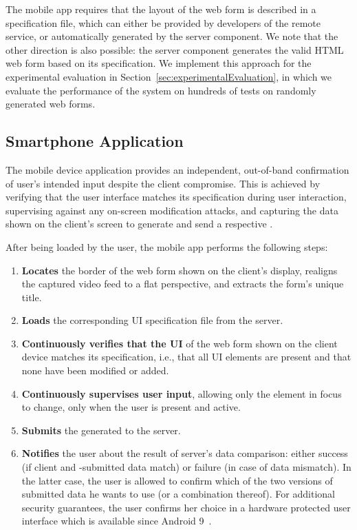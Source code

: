 The mobile app requires that the layout of the web form is described in a specification file, which can either be provided by developers of the remote service, or automatically generated by the \sysname server component.
We note that the other direction is also possible: the server component generates the valid HTML web form based on its specification.
We implement this approach for the experimental evaluation in Section~\ref{sec:experimentalEvaluation}, in which we evaluate the performance of the system on hundreds of tests on randomly generated web forms.




\subsection{\sysname Smartphone Application} \label{sec:systemDesign:phone}

The mobile device application provides an independent, out-of-band confirmation of user's intended input despite the client compromise.
This is achieved by verifying that the user interface matches its specification during user interaction, supervising against any on-screen modification attacks, and capturing the data shown on the client's screen to generate and send a respective \POI.

After being loaded by the user, the \sysname mobile app performs the following steps:
\begin{enumerate}%
    \item \textbf{Locates} the border of the web form shown on the client's display, realigns the captured video feed to a flat perspective, and extracts the form's unique title.
    \item \textbf{Loads} the corresponding UI specification file from the server.
    \item \textbf{Continuously verifies that the UI} of the web form shown on the client device matches its specification, i.e., that all UI elements are present and that none have been modified or added.
    \item \textbf{Continuously supervises user input}, allowing only the element in focus to change, only when the user is present and active.
	\item \textbf{Submits} the generated \POI to the server.
    \item \textbf{Notifies} the user about the result of server's data comparison: either success (if client and \md -submitted data match) or failure (in case of data mismatch).
    In the latter case, the user is allowed to confirm which of the two versions of submitted data he wants to use (or a combination thereof).
    For additional security guarantees, the user confirms her choice in a hardware protected user interface which is available since Android 9~\cite{androidConfirmation}.
\end{enumerate}

